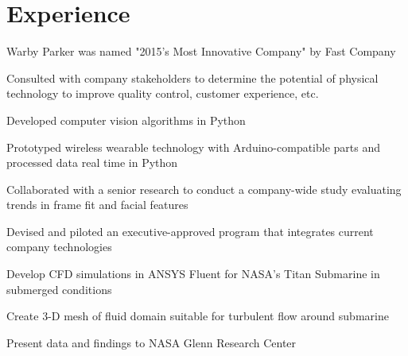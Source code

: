 \documentclass[]{deedy-resume-openfont}
\begin{document}
\begin{minipage}[t]{0.66\textwidth} 


\section{Experience}

\vspace{\topsep} %
\begin{tightemize}
\item Warby Parker was named "2015's Most Innovative Company" by Fast Company
\item Consulted with company stakeholders to determine the potential of physical technology to improve quality control, customer experience, etc.
\item Developed computer vision algorithms in Python 
\item Prototyped wireless wearable technology with Arduino-compatible parts and processed data real time in Python
\item Collaborated with a senior research to conduct a company-wide study evaluating trends in frame fit and facial features
\item Devised and piloted an executive-approved program that integrates current company technologies
\end{tightemize}
\sectionsep

\begin{tightemize}
\item Develop CFD simulations in ANSYS Fluent for NASA's Titan Submarine in submerged conditions
\item Create 3-D mesh of fluid domain suitable for turbulent flow around submarine
\item Present data and findings to NASA Glenn Research Center
\end{tightemize}
\sectionsep


\end{minipage}
\end{document}
